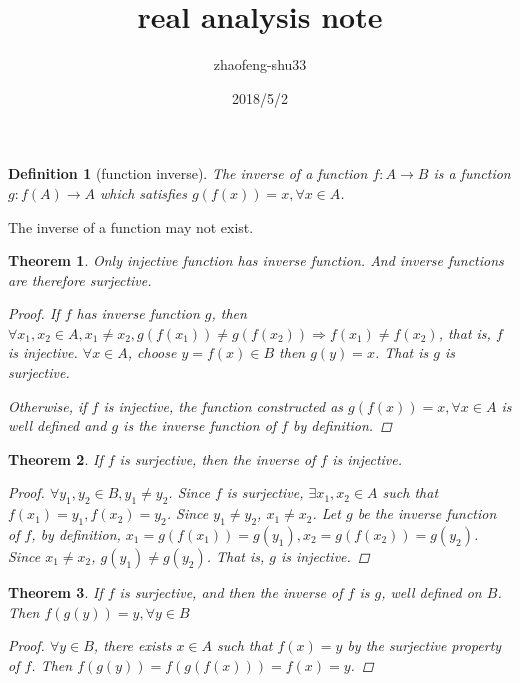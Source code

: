 \documentclass{article}
\newtheorem{definition}{Definition}
\newtheorem{theorem}{Theorem}
\begin{document}
\title{real analysis note}
\author{zhaofeng-shu33}
\date{2018/5/2}
\maketitle
\begin{definition}[function inverse]
The inverse of a function $f: A\to B$ is a function $g: f(A) \to A$ which satisfies $g(f(x))=x,\forall x\in A$.
\end{definition}
The inverse of a function may not exist.
\begin{theorem}
Only injective function has inverse function. And inverse functions are therefore surjective.
\begin{proof}
If $f$ has inverse function $g$, then
$\forall x_1,x_2\in A, x_1\neq x_2, g(f(x_1))\neq g(f(x_2))\Rightarrow f(x_1)\neq f(x_2)$, that is, $f$ is injective.
$\forall x\in A$, choose $y=f(x)\in B$ then $g(y)=x$. That is $g$ is surjective.

Otherwise, if $f$ is injective,  the function constructed as $g(f(x))=x,\forall x\in A$ is well defined and $g$ is the inverse function of $f$ by definition.
\end{proof}
\end{theorem}
\begin{theorem}
If $f$ is surjective, then the inverse of $f$ is injective.
\begin{proof}
$\forall y_1, y_2 \in B, y_1\neq y_2$. Since $f$ is surjective, $\exists x_1, x_2 \in A$ such that $f(x_1) = y_1, f(x_2) = y_2 $.
 Since $y_1 \neq y_2$, $x_1\neq x_2$. Let $g$ be the inverse function of $f$, by definition, $x_1 = g(f(x_1)) = g(y_1), x_2 = g(f(x_2)) = g(y_2)$. Since $x_1\neq x_2$, $g(y_1) \neq g(y_2)$. That is, $g$ is injective. 
 \end{proof}
 \end{theorem}
 \begin{theorem}
 If $f$ is surjective, and then the inverse of $f$ is $g$, well defined on $B$. Then $f(g(y)) = y ,\forall y\in B$
 \begin{proof}
 $\forall y \in B$, there exists $x\in A$ such that $f(x)=y$ by the surjective property of $f$. Then $f(g(y)) = f(g(f(x))) = f(x) = y$.
 \end{proof}
 \end{theorem}
\end{document}
